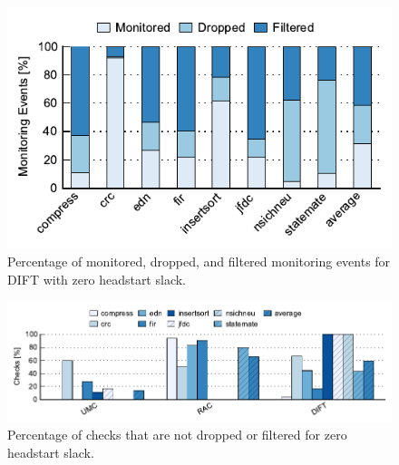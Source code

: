 \begin{figure}
  \begin{center}
    \includegraphics{monitoring_hard_drop/data/zero_slack_dift.pdf}
    \caption{Percentage of monitored, dropped, and filtered monitoring events
    for DIFT with zero headstart slack.}
    \label{fig:monitoring_hard_drop.evaluation.zero_slack_dift}
  \end{center}
\end{figure}

\begin{figure}
  \begin{center}
    \includegraphics{monitoring_hard_drop/data/zero_slack_coverage.pdf}
    \caption{Percentage of checks that are not dropped or filtered for zero
    headstart slack.}
    \label{fig:monitoring_hard_drop.evaluation.zero_slack_coverage}
  \end{center}
\end{figure}

